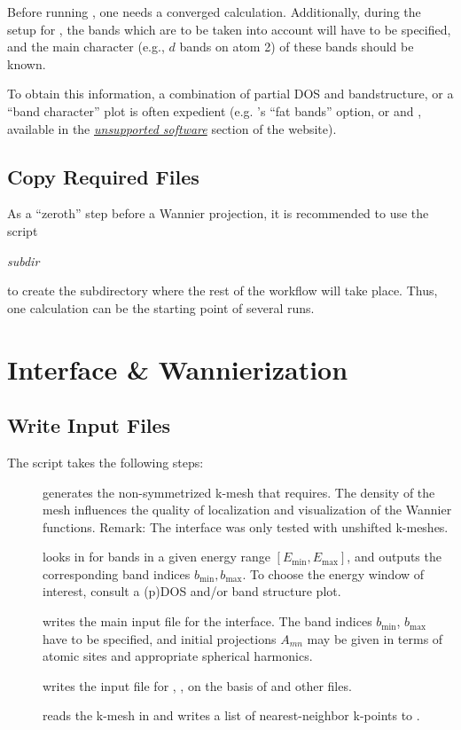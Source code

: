 Before running \wtow, one needs a converged \wien calculation.
Additionally, during the setup for \wtow, the bands which are to be
taken into account will have to be specified, and the main character
(e.g., $d$ bands on atom 2) of these bands should be known.

To obtain this information, a combination of partial DOS and
bandstructure, or a ``band character'' plot is often expedient
(e.g. 's ``fat bands'' option, or
 and , available in the
\href{http://www.wien2k.at/reg_user/unsupported/}{\textit{unsupported
    software}} section of the \wien website).


\subsection{Copy Required Files}

As a ``zeroth'' step before a Wannier projection, it is recommended to
use the script
\begin{usage}
  \prepwiiw \textit{subdir}
\end{usage}
to create the subdirectory  where the rest of
the workflow will take place. Thus, one \wien calculation can be the
starting point of several \wtow runs.


\section{Interface \& Wannierization}
\label{sec:quitckstart_main}

\subsection{Write Input Files}
\label{sec:init}

The script \initwiiw takes the following steps:
%
\begin{description}
\item[] generates the non-symmetrized k-mesh that
  \wannier requires.  The density of the mesh influences the quality
  of localization and visualization of the Wannier functions.  Remark:
  The interface was only tested with unshifted k-meshes.
\item[] looks in  for bands in a
  given energy range $[E_\text{min}, E_\text{max}]$, and outputs the
  corresponding band indices $b_\text{min}, b_\text{max}$.  To choose
  the energy window of interest, consult a (p)DOS and/or band
  structure plot.
\item[\writeinwf] writes the main input file  for the
  interface.  The band indices $b_\text{min}$, $b_\text{max}$ have to
  be specified, and initial projections $A_{mn}$ may be given in terms
  of atomic sites and appropriate spherical harmonics.
\item[\writewin] writes the input file for \wannierx, ,
  on the basis of  and other files.
\item[] reads the k-mesh in  and
  writes a list of nearest-neighbor k-points to .
\end{description}


